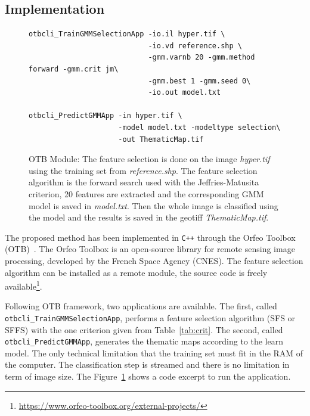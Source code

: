 \documentclass[journal,10pt]{IEEEtran}
\begin{document}
    \subsection{Implementation}
    \label{sec:otb-module}
    \begin{figure} 
        \centering %
        \begin{verbatim} 
otbcli_TrainGMMSelectionApp -io.il hyper.tif \
                            -io.vd reference.shp \
                            -gmm.varnb 20 -gmm.method forward -gmm.crit jm\
                            -gmm.best 1 -gmm.seed 0\
                            -io.out model.txt

otbcli_PredictGMMApp -in hyper.tif \
                     -model model.txt -modeltype selection\
                     -out ThematicMap.tif
        \end{verbatim}
        \caption{OTB Module: The feature selection is done on the image \emph{hyper.tif} using the training set from \emph{reference.shp}. The feature selection algorithm is the forward search used with the Jeffries-Matusita criterion, 20 features are extracted and the corresponding GMM model is saved in \emph{model.txt}. Then the whole image is classified using the model and the results is saved in the geotiff \emph{ThematicMap.tif}.}
        \label{fig:otb:ffs}
    \end{figure}

    
    The proposed  method has been implemented  in \texttt{C++} through
    the  Orfeo  Toolbox (OTB)~\cite{christophe2008orfeo}.   The  Orfeo
    Toolbox  is  an  open-source  library  for  remote  sensing  image
    processing,  developed by  the  French Space  Agency (CNES).   The
    feature selection algorithm  can be installed as  a remote module,
    the           source            code           is           freely
    available\footnote{\url{https://www.orfeo-toolbox.org/external-projects/}}.

    Following  OTB framework,  two  applications  are available.   The
    first,  called  \texttt{otbcli\_TrainGMMSelectionApp}, performs  a
    feature selection algorithm  (SFS or SFFS) with  the one criterion
    given      from Table~\ref{tab:crit}.       The      second,      called
    \texttt{otbcli\_PredictGMMApp},   generates   the  thematic   maps
    according to the  learn model. The only  technical limitation that
    the  training set  must  fit  in the  RAM  of  the computer.   The
    classification step is streamed and there is no limitation in term
    of image  size. The Figure~\ref{fig:otb:ffs} shows  a code excerpt
    to run the application.
\end{document}
